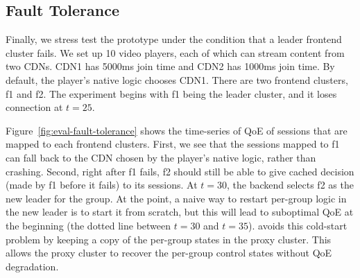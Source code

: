 








\subsection{Fault Tolerance}
\label{sec:eval:fail}

Finally, we stress test the prototype under the condition that a leader frontend cluster fails. 
 We set up 10 video players, each of which can stream content from two CDNs. CDN1 has 5000ms join time and CDN2 has 1000ms join time. By default, the player's native logic chooses CDN1.
There are two frontend clusters, f1 and f2. 
The experiment begins with f1 being the leader cluster, and it loses connection at $t=25$.

Figure~\ref{fig:eval-fault-tolerance} shows the time-series of QoE of sessions that are mapped to each frontend clusters.
First, we see that the sessions mapped to f1 can fall back to the CDN chosen by the player's native logic, rather than crashing.
Second, right after f1 fails, f2 should still be able to give cached decision (made by f1 before it fails) to its sessions.
At $t=30$, the backend selects f2 as the new leader for the group. 
At the point, a naive way to restart per-group logic in the new leader is to start it from scratch, but this will lead to suboptimal QoE at the beginning (the dotted line between $t=30$ and $t=35$).
\name avoids this cold-start problem by keeping a copy of the per-group states in the proxy cluster. This allows the proxy cluster to recover the per-group control states without QoE degradation.




